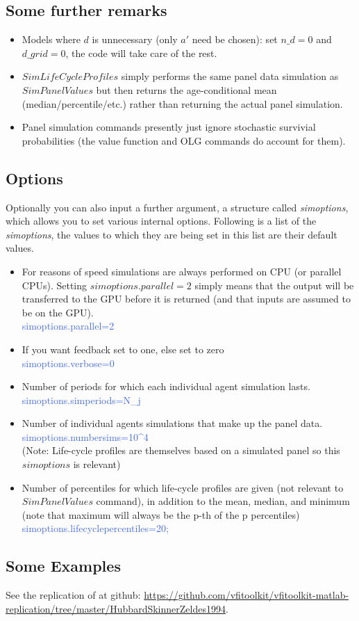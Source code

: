 \subsection{Some further remarks}
\begin{itemize}
 \item Models where $d$ is unnecessary (only $a'$ need be chosen): set $n\_{}d=0$ and $d\_{}grid=0$, the code will
    take care of the rest.
 \item $SimLifeCycleProfiles$ simply performs the same panel data simulation as $SimPanelValues$ but then returns the age-conditional mean (median/percentile/etc.)
    rather than returning the actual panel simulation.
 \item Panel simulation commands presently just ignore stochastic survivial probabilities (the value function and OLG commands do account for them).
\end{itemize}

\subsection{Options}
Optionally you can also input a further argument, a structure called \textit{simoptions}, which allows you to set various internal options.
Following is a list of the \textit{simoptions}, the values to which they are being set in this list are their default values.
 \begin{itemize}
  \item For reasons of speed simulations are always performed on CPU (or parallel CPUs). Setting $simoptions.parallel=2$ simply
    means that the output will be transferred to the GPU before it is returned (and that inputs are assumed to be on
    the GPU). \\
    \textcolor{RoyalBlue}{simoptions.parallel=2}
  \item If you want feedback set to one, else set to zero \\
    \textcolor{RoyalBlue}{simoptions.verbose=0}
  \item Number of periods for which each individual agent simulation lasts. \\
    \textcolor{RoyalBlue}{simoptions.simperiods=N\_{}j}
  \item Number of individual agents simulations that make up the panel data. \\
    \textcolor{RoyalBlue}{simoptions.numbersims=10\^{}4} \\
    (Note: Life-cycle profiles are themselves based on a simulated panel so this $simoptions$ is relevant)
  \item Number of percentiles for which life-cycle profiles are given (not relevant to $SimPanelValues$ command),
    in addition to the mean, median, and minimum (note that maximum will always be the p-th of the p percentiles) \\
    \textcolor{RoyalBlue}{simoptions.lifecyclepercentiles=20;}
\end{itemize}

\subsection{Some Examples}
See the replication of \cite*{HubbardSkinnerZeldes1994} at github: \href{https://github.com/vfitoolkit/vfitoolkit-matlab-replication/tree/master/HubbardSkinnerZeldes1994}{https://github.com/vfitoolkit/vfitoolkit-matlab-replication/tree/master/HubbardSkinnerZeldes1994}.
